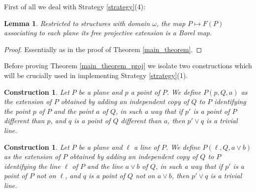 \documentclass{amsart}
\newtheorem{lemma}[theorem]{Lemma}
\newtheorem{construction}[theorem]{Construction}
\numberwithin{claimcounter}{theorem}
\begin{document}
	First of all we deal with Strategy \ref{strategy}(4):

	\begin{lemma}\label{Borel_th} Restricted to structures with domain $\omega$, the map $P \mapsto F(P)$ associating to each plane its free projective extension is a Borel map.
\end{lemma}

	\begin{proof} Essentially as in the proof of Theorem \ref{main_theorem}.
\end{proof}

	Before proving Theorem \ref{main_theorem_proj} we isolate two constructions which will be crucially used in implementing Strategy \ref{strategy}(1).
	
	\begin{construction}\label{construction1} Let $P$ be a plane and $p$ a point of $P$. We define $P(p, Q, a)$ as the extension of $P$ obtained by adding an independent copy of $Q$ to $P$ identifying the point $p$ of $P$ and the point $a$ of $Q$, in such a way that if $p'$ is a point of $P$ different than $p$, and $q$ is a point of $Q$ different than $a$, then $p' \vee q$ is a trivial line.
\end{construction}

	\begin{construction}\label{construction2} Let $P$ be a plane and $\ell$ a line of $P$. We define $P(\ell, Q, a \vee b)$ as the extension of $P$ obtained by adding an independent copy of $Q$ to $P$ identifying the line $\ell$ of $P$ and the line $a \vee b$ of $Q$, in such a way that if $p'$ is a point of $P$ not on $\ell$, and $q$ is a point of $Q$ not on $a \vee b$, then $p' \vee q$ is a trivial line.
\end{construction}
\end{document}
